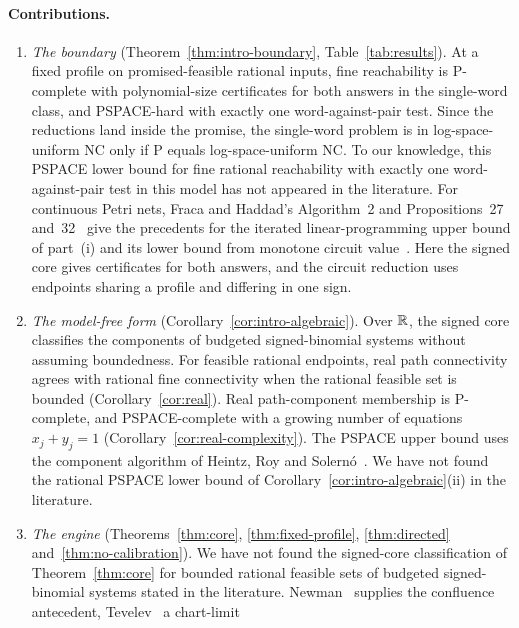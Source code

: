\paragraph{Contributions.}
\begin{enumerate}
\item \emph{The boundary} (Theorem~\ref{thm:intro-boundary},
Table~\ref{tab:results}). At a fixed profile on promised-feasible rational
inputs, fine reachability is P-complete with polynomial-size certificates for
both answers in the single-word class, and PSPACE-hard with exactly one
word-against-pair test.
Since the reductions land inside the promise, the single-word problem is in
log-space-uniform NC only if P equals log-space-uniform NC.
To our knowledge, this PSPACE lower bound for fine rational reachability with
exactly one word-against-pair test in this model has not appeared in the
literature. For continuous Petri nets, Fraca and Haddad's Algorithm~2 and
Propositions~27 and~32~\cite{fracahaddad} give the precedents for the
iterated linear-programming upper bound of part~(i) and its lower bound from
monotone circuit value~\cite{goldschlager,greenlawhooverruzzo}.
Here the signed core gives certificates for both answers, and the circuit
reduction uses endpoints sharing a profile and differing in one sign.
\item \emph{The model-free form} (Corollary~\ref{cor:intro-algebraic}). Over
$\mathbb{R}$, the signed core classifies the components of budgeted signed-binomial
systems without assuming boundedness. For feasible rational endpoints, real
path connectivity agrees with rational fine connectivity when the rational
feasible set is bounded (Corollary~\ref{cor:real}). Real path-component
membership is P-complete, and PSPACE-complete with a growing number of
equations $x_j+y_j=1$ (Corollary~\ref{cor:real-complexity}). The PSPACE
upper bound uses the component algorithm of Heintz, Roy and
Solern\'o~\cite{heintzroysolerno1994components}. We have
not found the rational PSPACE lower bound of
Corollary~\ref{cor:intro-algebraic}(ii) in the literature.
\item \emph{The engine} (Theorems~\ref{thm:core}, \ref{thm:fixed-profile},
\ref{thm:directed} and~\ref{thm:no-calibration}). We have not found
the signed-core classification of Theorem~\ref{thm:core} for bounded
rational feasible sets of budgeted signed-binomial systems stated in the
literature. Newman~\cite{newman}
supplies the confluence antecedent, Tevelev~\cite{tevelev} a chart-limit

\end{enumerate}
